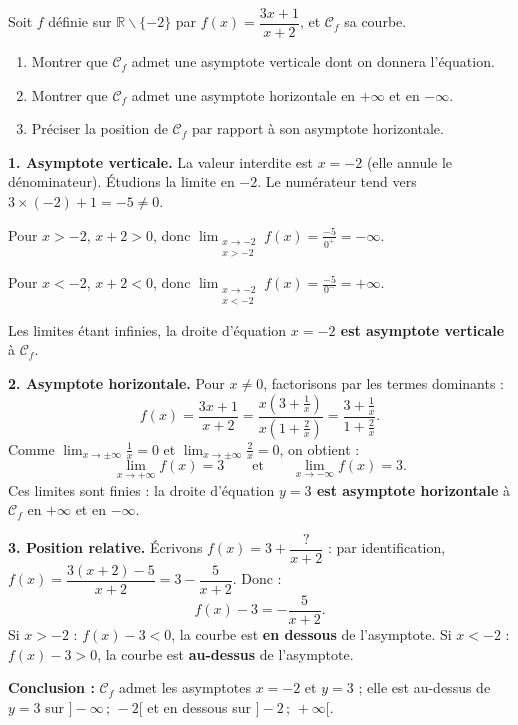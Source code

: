 \documentclass[11pt]{article}
\def\setminus{\mathbin{\backslash}}\let\smallsetminus\setminus
\begin{document}
\begin{exoresolu}
Soit $f$ définie sur $\mathbb{R}\setminus\{-2\}$ par $f(x)=\dfrac{3x+1}{x+2}$, et $\mathcal{C}_f$ sa courbe.
\begin{enumerate}
\item Montrer que $\mathcal{C}_f$ admet une asymptote verticale dont on donnera l'équation.
\item Montrer que $\mathcal{C}_f$ admet une asymptote horizontale en $+\infty$ et en $-\infty$.
\item Préciser la position de $\mathcal{C}_f$ par rapport à son asymptote horizontale.
\end{enumerate}
\tcblower
\textbf{1. Asymptote verticale.} La valeur interdite est $x=-2$ (elle annule le dénominateur). Étudions la limite en $-2$. Le numérateur tend vers $3\times(-2)+1=-5\neq 0$.

Pour $x>-2$, $x+2>0$, donc $\displaystyle\lim_{\substack{x\to -2\\x>-2}}f(x)=\frac{-5}{0^+}=-\infty$.

Pour $x<-2$, $x+2<0$, donc $\displaystyle\lim_{\substack{x\to -2\\x<-2}}f(x)=\frac{-5}{0^-}=+\infty$.

Les limites étant infinies, la droite d'équation \textbf{$x=-2$ est asymptote verticale} à $\mathcal{C}_f$.

\textbf{2. Asymptote horizontale.} Pour $x\neq 0$, factorisons par les termes dominants :
\[ f(x)=\frac{3x+1}{x+2}=\frac{x\left(3+\frac1x\right)}{x\left(1+\frac2x\right)}=\frac{3+\frac1x}{1+\frac2x}. \]
Comme $\displaystyle\lim_{x\to\pm\infty}\frac1x=0$ et $\displaystyle\lim_{x\to\pm\infty}\frac2x=0$, on obtient :
\[ \lim_{x\to+\infty}f(x)=3 \qquad\text{et}\qquad \lim_{x\to-\infty}f(x)=3. \]
Ces limites sont finies : la droite d'équation \textbf{$y=3$ est asymptote horizontale} à $\mathcal{C}_f$ en $+\infty$ et en $-\infty$.

\textbf{3. Position relative.} Écrivons $f(x)=3+\dfrac{?}{x+2}$ : par identification, $f(x)=\dfrac{3(x+2)-5}{x+2}=3-\dfrac{5}{x+2}$. Donc :
\[ f(x)-3 = -\frac{5}{x+2}. \]
Si $x>-2$ : $f(x)-3<0$, la courbe est \textbf{en dessous} de l'asymptote. Si $x<-2$ : $f(x)-3>0$, la courbe est \textbf{au-dessus} de l'asymptote.

\textbf{Conclusion :} $\mathcal{C}_f$ admet les asymptotes $x=-2$ et $y=3$ ; elle est au-dessus de $y=3$ sur $]-\infty\,;\,-2[$ et en dessous sur $]-2\,;\,+\infty[$.
\end{exoresolu}
\end{document}
